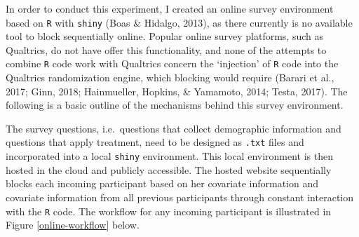 \documentclass[12pt,econ]{sources/authesis}
\begin{document}
In order to conduct this experiment, I created an online survey environment based on \texttt{R} with \texttt{shiny} (Boas \& Hidalgo, 2013), as there currently is no available tool to block sequentially online. Popular online survey platforms, such as Qualtrics, do not have offer this functionality, and none of the attempts to combine \texttt{R} code work with Qualtrics concern the `injection' of \texttt{R} code into the Qualtrics randomization engine, which blocking would require (Barari et al., 2017; Ginn, 2018; Hainmueller, Hopkins, \& Yamamoto, 2014; Testa, 2017). The following is a basic outline of the mechanisms behind this survey environment.

The survey questions, i.e.~questions that collect demographic information and questions that apply treatment, need to be designed as \texttt{.txt} files and incorporated into a local \texttt{shiny} environment. This local environment is then hosted in the cloud and publicly accessible. The hosted website sequentially blocks each incoming participant based on her covariate information and covariate information from all previous participants through constant interaction with the \texttt{R} code. The workflow for any incoming participant is illustrated in Figure \ref{online-workflow} below.
\end{document}
